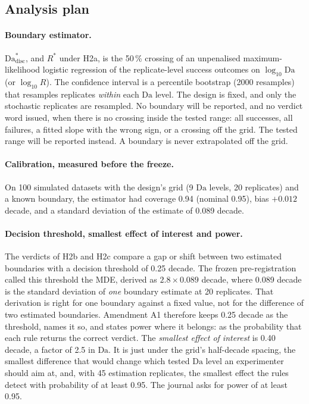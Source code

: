 \documentclass[11pt]{article}
\newcommand{\Da}{\mathrm{Da}}
\begin{document}
\subsection{Analysis plan}
\label{sec:analysis}

\paragraph{Boundary estimator.}
$\Da^{*}_{\mathrm{disc}}$, and $R^{*}$ under H2a, is the 50\,\% crossing of an
unpenalised maximum-likelihood logistic regression of the replicate-level success outcomes
on $\log_{10}\Da$ (or $\log_{10}R$). The confidence interval is a percentile bootstrap
(2000 resamples) that resamples replicates \emph{within} each $\Da$ level. The design is
fixed, and only the stochastic replicates are resampled. No boundary will be reported, and
no verdict word issued, when there is no crossing inside the tested range: all successes,
all failures, a fitted slope with the wrong sign, or a crossing off the grid. The tested
range will be reported instead. A boundary is never extrapolated off the grid.

\paragraph{Calibration, measured before the freeze.} On 100 simulated datasets with the
design's grid (9 $\Da$ levels, 20 replicates) and a known boundary, the estimator had
coverage 0.94 (nominal 0.95), bias $+0.012$ decade, and a standard deviation of the
estimate of 0.089 decade.

\paragraph{Decision threshold, smallest effect of interest and power.}
The verdicts of H2b and H2c compare a gap or shift between two estimated boundaries with a
decision threshold of 0.25 decade. The frozen pre-registration called this threshold the
MDE, derived as $2.8\times0.089$ decade, where 0.089 decade is the standard deviation of
\emph{one} boundary estimate at 20 replicates. That derivation is right for one boundary
against a fixed value, not for the difference of two estimated boundaries. Amendment A1
therefore keeps 0.25 decade as the threshold, names it so, and states power where it
belongs: as the probability that each rule returns the correct verdict. The \emph{smallest
effect of interest} is 0.40 decade, a factor of 2.5 in $\Da$. It is just under the grid's
half-decade spacing, the smallest difference that would change which tested $\Da$ level an
experimenter should aim at, and, with 45 estimation replicates, the smallest effect the
rules detect with probability of at least 0.95. The journal asks for power of at least
0.95.
\end{document}
